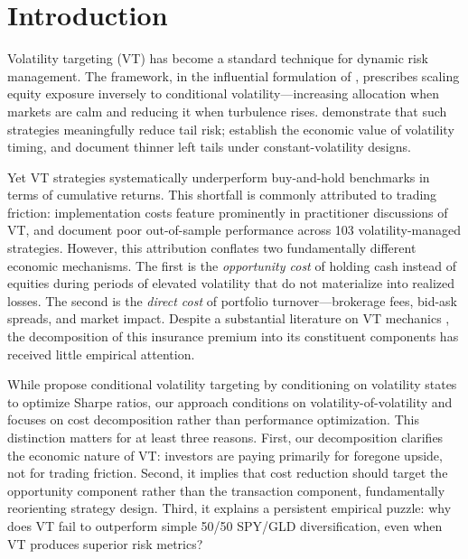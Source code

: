 \documentclass[12pt,a4paper]{article}
\begin{document}
\newpage

\section{Introduction}
\label{sec:intro}

Volatility targeting (VT) has become a standard technique for dynamic risk management. The framework, in the influential formulation of \citet{moreira2017}, prescribes scaling equity exposure inversely to conditional volatility---increasing allocation when markets are calm and reducing it when turbulence rises. \citet{harvey2018} demonstrate that such strategies meaningfully reduce tail risk; \citet{fleming2001} establish the economic value of volatility timing, and \citet{hocquard2013} document thinner left tails under constant-volatility designs.

Yet VT strategies systematically underperform buy-and-hold benchmarks in terms of cumulative returns. This shortfall is commonly attributed to trading friction: implementation costs feature prominently in practitioner discussions of VT, and \citet{cederburg2020} document poor out-of-sample performance across 103 volatility-managed strategies. However, this attribution conflates two fundamentally different economic mechanisms. The first is the \emph{opportunity cost} of holding cash instead of equities during periods of elevated volatility that do not materialize into realized losses. The second is the \emph{direct cost} of portfolio turnover---brokerage fees, bid-ask spreads, and market impact. Despite a substantial literature on VT mechanics \citep{moreira2017, barroso2015, cederburg2020, bongaerts2020, liu2019}, the decomposition of this insurance premium into its constituent components has received little empirical attention.

While \citet{bongaerts2020} propose conditional volatility targeting by conditioning on volatility states to optimize Sharpe ratios, our approach conditions on volatility-of-volatility and focuses on cost decomposition rather than performance optimization. This distinction matters for at least three reasons. First, our decomposition clarifies the economic nature of VT: investors are paying primarily for foregone upside, not for trading friction. Second, it implies that cost reduction should target the opportunity component rather than the transaction component, fundamentally reorienting strategy design. Third, it explains a persistent empirical puzzle: why does VT fail to outperform simple 50/50 SPY/GLD diversification, even when VT produces superior risk metrics?
\end{document}
